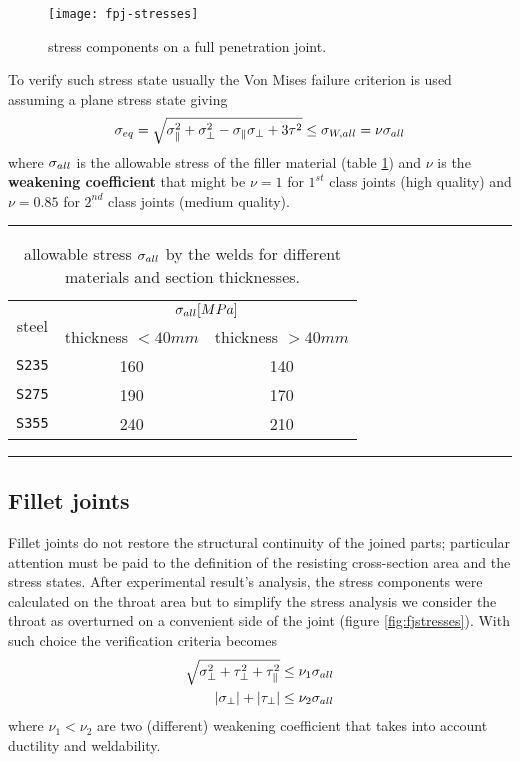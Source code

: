 	\begin{SCfigure}[1][bht]
		\centering \texttt{[image: fpj-stresses]} 
		\caption{stress components on a  full penetration joint.} \label{fig:fpjstresses}
	\end{SCfigure}

	To verify such stress state usually the Von Mises failure criterion is used assuming a plane stress state giving
	\begin{equation}
		\sigma_{eq} = \sqrt{\sigma_\parallel^2 + \sigma_\perp^2 - \sigma_\parallel \sigma_\perp + 3\tau^2} \leq \sigma_{W,all} = \nu \sigma_{all}
	\end{equation}
	where $\sigma_{all}$ is the allowable stress of the filler material (table \ref{tab:weldsall}) and $\nu$ is the \textbf{weakening coefficient} that might be $\nu=1$ for $1^{st}$ class joints (high quality) and $\nu=0.85$ for $2^{nd}$ class joints (medium quality).
	
	\begin{table}[bht]
		\centering
		\rule{0.9\linewidth}{1pt}
		\caption{allowable stress $\sigma_{all}$ by the welds for different materials and section thicknesses.}
		\label{tab:weldsall}		
		\begin{tabular}{c | c c }
			\multirow{2}{*}{steel} & \multicolumn{2}{c}{$\sigma_{all} [MPa]$} \\
			& thickness $< 40mm$ & thickness $> 40mm$ \\ \hline
			\texttt{S235} & 160 & 140  \\
			\texttt{S275} & 190 & 170  \\
			\texttt{S355} & 240 & 210  \\
			
		\end{tabular}
		\rule{0.9\linewidth}{1pt}
	\end{table}
	
\subsection{Fillet joints}
	Fillet joints do not restore the structural continuity of the joined parts; particular attention must be paid to the definition of the resisting cross-section area and the stress states.	After experimental result's analysis, the stress components were calculated on the throat area but to simplify the stress analysis we consider the throat as overturned on a convenient side of the joint (figure \ref{fig:fjstresses}). With such choice the verification criteria becomes
	\begin{equation}
	\begin{aligned}
		\sqrt{\sigma_\perp^2 + \tau_\perp^2 + \tau_\parallel^2} & \leq \nu_1 \sigma_{all} \\ |\sigma_\perp| + |\tau_\perp| & \leq \nu_2 \sigma_{all}
	\end{aligned}
	\end{equation}
	where $\nu_1 < \nu_2$ are two (different) weakening coefficient that takes into account ductility and weldability.
	
